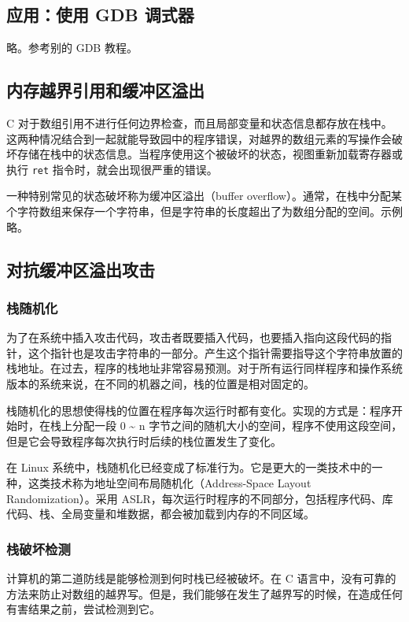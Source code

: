 \subsection{应用：使用 GDB 调式器}

略。参考别的 GDB 教程。

\subsection{内存越界引用和缓冲区溢出}

C 对于数组引用不进行任何边界检查，而且局部变量和状态信息都存放在栈中。这两种情况结合到一起就能导致园中的程序错误，对越界的数组元素的写操作会破坏存储在栈中的状态信息。当程序使用这个被破坏的状态，视图重新加载寄存器或执行 \verb|ret| 指令时，就会出现很严重的错误。

一种特别常见的状态破坏称为缓冲区溢出（buffer overflow）。通常，在栈中分配某个字符数组来保存一个字符串，但是字符串的长度超出了为数组分配的空间。示例略。

\subsection{对抗缓冲区溢出攻击}

\subsubsection{栈随机化}

为了在系统中插入攻击代码，攻击者既要插入代码，也要插入指向这段代码的指针，这个指针也是攻击字符串的一部分。产生这个指针需要指导这个字符串放置的栈地址。在过去，程序的栈地址非常容易预测。对于所有运行同样程序和操作系统版本的系统来说，在不同的机器之间，栈的位置是相对固定的。

栈随机化的思想使得栈的位置在程序每次运行时都有变化。实现的方式是：程序开始时，在栈上分配一段 0 \~{} n 字节之间的随机大小的空间，程序不使用这段空间，但是它会导致程序每次执行时后续的栈位置发生了变化。

在 Linux 系统中，栈随机化已经变成了标准行为。它是更大的一类技术中的一种，这类技术称为地址空间布局随机化（Address-Space Layout Randomization）。采用 ASLR，每次运行时程序的不同部分，包括程序代码、库代码、栈、全局变量和堆数据，都会被加载到内存的不同区域。

\subsubsection{栈破坏检测}

计算机的第二道防线是能够检测到何时栈已经被破坏。在 C 语言中，没有可靠的方法来防止对数组的越界写。但是，我们能够在发生了越界写的时候，在造成任何有害结果之前，尝试检测到它。

